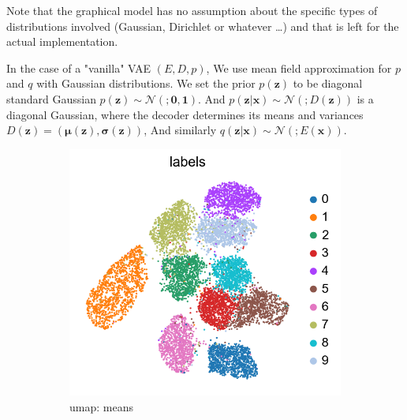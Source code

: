 \documentclass[11pt, a4paper]{report}
\theoremstyle{plain}
\theoremstyle{definition}
\theoremstyle{remark}
\newcommand{\x}{\mathbf{x}}
\newcommand{\z}{\mathbf{z}}
\newcommand{\NN}{\mathcal{N}}
\newcommand{\bv}[1]{\boldsymbol{#1}}
\begin{document}
Note that the graphical model has no assumption about the specific types of
distributions involved (Gaussian, Dirichlet or whatever \dots) and that is left
for the actual implementation.

In the case of a "vanilla" VAE $(E,D,p)$, 
We use mean field approximation for $p$ and $q$ with Gaussian distributions.
We set the prior $p(\z)$ to be diagonal standard Gaussian
$p(\z) \sim \NN(;\bv{0},\bv{1})$.
And $p(\z | \x) \sim \NN(;D(\z))$ is a diagonal Gaussian, where the decoder
determines its means and variances $D(\z) = (\bv{\mu}(\z), \bv{\sigma}(\z))$, 
And similarly $q(\z | \x) \sim \NN(;E(\x))$.

\begin{figure}[!h]
\begin{framed}
\centering
\begin{subfigure}[t]{0.3\textwidth}
\includegraphics[width=\textwidth]{images/vae.umap.mnist.mu.png}
\caption{umap: means}
\end{subfigure}
\begin{subfigure}[t]{0.3\textwidth}

\end{subfigure}
\end{framed}
\end{figure}
\end{document}
